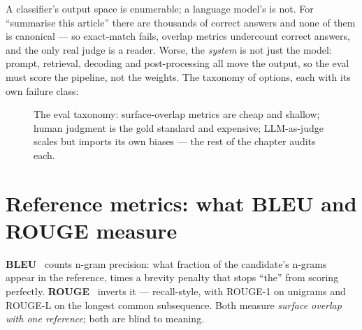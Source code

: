 A classifier's output space is enumerable; a language model's is not.
For ``summarise this article'' there are thousands of correct answers
and none of them is canonical --- so exact-match fails, overlap
metrics undercount correct answers, and the only real judge is a
reader. Worse, the \emph{system} is not just the model: prompt,
retrieval, decoding and post-processing all move the output, so the
eval must score the pipeline, not the weights. The taxonomy of
options, each with its own failure class:

\begin{figure}[htbp]
\centering
{}
\caption{The eval taxonomy: surface-overlap metrics are cheap and
shallow; human judgment is the gold standard and expensive;
LLM-as-judge scales but imports its own biases --- the rest of the
chapter audits each.}
\label{fig:taxonomy}
\end{figure}

\section{Reference metrics: what BLEU and ROUGE measure}
\label{sec:refmetrics}

\textbf{BLEU}~\cite{papineni2002} counts n-gram
precision: what fraction of the candidate's n-grams appear in the
reference, times a brevity penalty that stops ``the'' from scoring
perfectly. \textbf{ROUGE}~\cite{lin2004} inverts it ---
recall-style, with ROUGE-1 on unigrams and ROUGE-L on the longest
common subsequence. Both measure \emph{surface overlap with one
reference}; both are blind to meaning.

